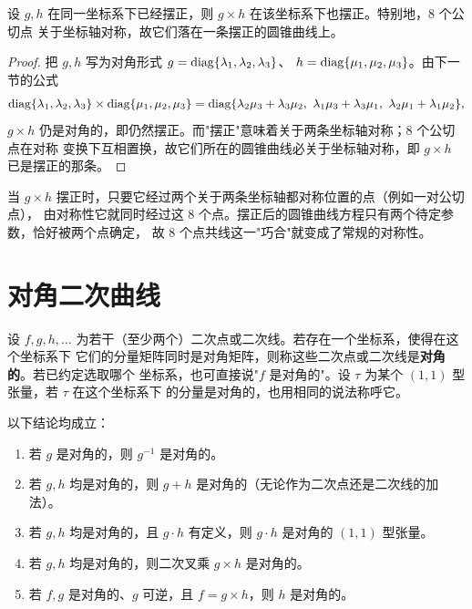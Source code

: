 \begin{proposition}
\label{prop:8pts}
设 $g,h$ 在同一坐标系下已经摆正，则 $g\times h$ 在该坐标系下也摆正。特别地，$8$ 个公切点
关于坐标轴对称，故它们落在一条摆正的圆锥曲线上。
\end{proposition}

\begin{proof}
把 $g,h$ 写为对角形式 $g=\operatorname{diag}\{\lambda_1,\lambda_2,\lambda_3\}$、
$h=\operatorname{diag}\{\mu_1,\mu_2,\mu_3\}$。由下一节的公式
\[
\operatorname{diag}\{\lambda_1,\lambda_2,\lambda_3\}\times\operatorname{diag}\{\mu_1,\mu_2,\mu_3\}
=\operatorname{diag}\{\lambda_2\mu_3+\lambda_3\mu_2,\ \lambda_1\mu_3+\lambda_3\mu_1,\
\lambda_2\mu_1+\lambda_1\mu_2\},
\]
$g\times h$ 仍是对角的，即仍然摆正。而"摆正"意味着关于两条坐标轴对称；$8$ 个公切点在对称
变换下互相置换，故它们所在的圆锥曲线必关于坐标轴对称，即 $g\times h$ 已是摆正的那条。
\end{proof}

\begin{remark}
当 $g\times h$ 摆正时，只要它经过两个关于两条坐标轴都对称位置的点（例如一对公切点），
由对称性它就同时经过这 $8$ 个点。摆正后的圆锥曲线方程只有两个待定参数，恰好被两个点确定，
故 $8$ 个点共线这一"巧合"就变成了常规的对称性。
\end{remark}

\section{对角二次曲线}

\begin{definition}
\label{def:diag}
设 $f,g,h,\dots$ 为若干（至少两个）二次点或二次线。若存在一个坐标系，使得在这个坐标系下
它们的分量矩阵同时是对角矩阵，则称这些二次点或二次线是\textbf{对角的}。若已约定选取哪个
坐标系，也可直接说"$f$ 是对角的"。设 $\tau$ 为某个 $(1,1)$ 型张量，若 $\tau$ 在这个坐标系下
的分量是对角的，也用相同的说法称呼它。
\end{definition}

\begin{proposition}[封闭性]
\label{prop:closure}
以下结论均成立：
\begin{enumerate}[label=(\arabic*),itemsep=2pt]
  \item 若 $g$ 是对角的，则 $g^{-1}$ 是对角的。
  \item 若 $g,h$ 均是对角的，则 $g+h$ 是对角的（无论作为二次点还是二次线的加法）。
  \item 若 $g,h$ 均是对角的，且 $g\cdot h$ 有定义，则 $g\cdot h$ 是对角的 $(1,1)$ 型张量。
  \item 若 $g,h$ 均是对角的，则二次叉乘 $g\times h$ 是对角的。
  \item 若 $f,g$ 是对角的、$g$ 可逆，且 $f=g\times h$，则 $h$ 是对角的。
\end{enumerate}
\end{proposition}

